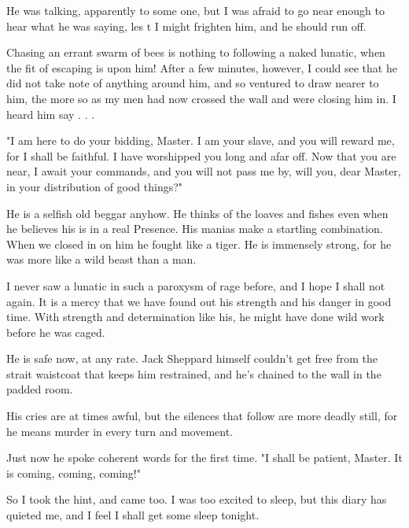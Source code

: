 He was talking, apparently to some one, but I was afraid to go near enough to hear what he was saying, les t I might frighten him, and he should run off. 

Chasing an errant swarm of bees is nothing to following a naked lunatic, when the fit of escaping is upon him! After a few minutes, however, I could see that he did not take note of anything around him, and so ventured to draw nearer to him, the more so as my men had now crossed the wall and were closing him in. I heard him say . . . 

"I am here to do your bidding, Master. I am your slave, and you will reward me, for I shall be faithful. I have worshipped you long and afar off. Now that you are near, I await your commands, and you will not pass me by, will you, dear Master, in your distribution of good things?" 

He is a selfish old beggar anyhow. He thinks of the loaves and fishes even when he believes his is in a real Presence. His manias make a startling combination. When we closed in on him he fought like a tiger. He is immensely strong, for he was more like a wild beast than a man. 

I never saw a lunatic in such a paroxysm of rage before, and I hope I shall not again. It is a mercy that we have found out his strength and his danger in good time. With strength and determination like his, he might have done wild work before he was caged. 

He is safe now, at any rate. Jack Sheppard himself couldn't get free from the strait waistcoat that keeps him restrained, and he's chained to the wall in the padded room. 

His cries are at times awful, but the silences that follow are more deadly still, for he means murder in every turn and movement. 

Just now he spoke coherent words for the first time. "I shall be patient, Master. It is coming, coming, coming!" 

So I took the hint, and came too. I was too excited to sleep, but this diary has quieted me, and I feel I shall get some sleep tonight. 
